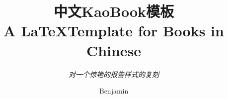 \documentclass[
    a4paper, %
    fontsize=11pt, %
    twoside=false, %
    open=any, %
    chapterentrydots=true, %
    numbers=noenddot, %
	toc=nottotoc,
	BCOR=12mm,
	DIV=calc,
]{styles/kaobookCJKsc}
\begin{document}


\titlehead{A \LaTeX Template for Books in Chinese}
\subject{中文KaoBook模板}

\title{中文KaoBook模板\\A \LaTeX Template for Books in Chinese}
\subtitle{\fzkai\textit{对一个惊艳的报告样式的复刻}}


\author{Benjamin}
\date{\zhtoday}

\publishers{回声一出版社}


\frontmatter %








\end{document}
